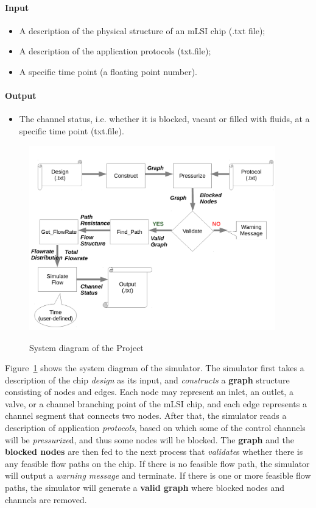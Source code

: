 \documentclass{article}
\begin{document}
\paragraph{Input}
\begin{itemize}
\item A description of the physical structure of an mLSI chip (.txt file);
\item A description of the application protocols (txt.file);
\item A specific time point (a floating point number).
\end{itemize}
\paragraph{Output}
\begin{itemize}
\item The channel status, i.e. whether it is blocked, vacant or filled with fluids, at a specific time point (txt.file).
\end{itemize}

\begin{figure}
\caption{System diagram of the Project}
\includegraphics[height = 8cm]{systemdiagram}
\label{fig:system}
\end{figure}

Figure~\ref{fig:system} shows the system diagram of the simulator. 
The simulator first takes a description of the chip \textit{design} as its input, and \textit{constructs} a \textbf{graph} structure consisting of nodes and edges. Each node may represent an inlet, an outlet, a valve, or a channel branching point of the mLSI chip, and each edge represents a channel segment that connects two nodes.
After that, the simulator reads a description of application \textit{protocols},
based on which some of the control channels will be \textit{pressurize}d,
and thus some nodes will be blocked.
The \textbf{graph} and the \textbf{blocked nodes} are then fed to the next process that \textit{validate}s whether there is any feasible flow paths on the chip.
If there is no feasible flow path, the simulator will output a \textit{warning message} and terminate. If there is one or more feasible flow paths, the simulator will generate a \textbf{valid graph} where blocked nodes and channels are removed. 
\end{document}
